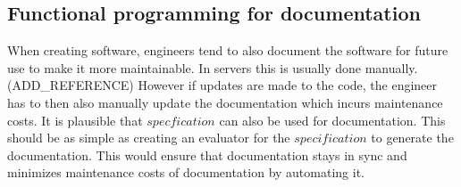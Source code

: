 \subsection{Functional programming for documentation}

When creating software, engineers tend to also document the software for future
use to make it more maintainable. In servers this is usually done manually.
(ADD\_REFERENCE) However if updates are made to the code, the engineer has to
then also manually update the documentation which incurs maintenance costs. It
is plausible that $specfication$ can also be used for documentation. This
should be as simple as creating an evaluator for the $specification$ to
generate the documentation. This would ensure that documentation stays in sync
and minimizes maintenance costs of documentation by automating it.

